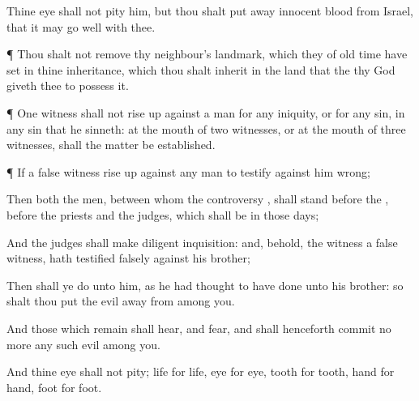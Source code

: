 {Thine
eye shall not
pity him, but thou shalt put
away
{}
innocent
blood from
Israel, that it may go
well with thee.


\par }{\PP {}¶ Thou shalt not
remove thy
neighbour’s
landmark, which they of old
time have
set in thine
inheritance, which thou shalt
inherit in the
land that the
{} thy
God
giveth thee to
possess it.


\par }{\PP {}¶
One
witness shall not rise
up against a
man for any
iniquity, or for any
sin, in any
sin that he
sinneth: at the
mouth of
two
witnesses, or at the
mouth of
three
witnesses, shall the
matter be
established.


\par }{\PP {}¶ If a
false
witness rise
up against any
man to
testify against him
{}
wrong;

Then
both the
men, between whom the
controversy
{}, shall
stand
before the
{},
before the
priests and the
judges, which shall be in those
days;

And the
judges shall make
diligent
inquisition: and, behold,
{} the
witness
{} a
false
witness,
{} hath
testified
falsely against his
brother;

Then shall ye
do unto him, as he had
thought to have
done unto his
brother: so shalt thou
put the
evil
away from
among you.

And those which
remain shall
hear, and
fear, and shall
henceforth
commit no more
any such
evil
among you.

And thine
eye shall not
pity;
{}
life
{} for
life,
eye for
eye,
tooth for
tooth,
hand for
hand,
foot for
foot.




\par }
